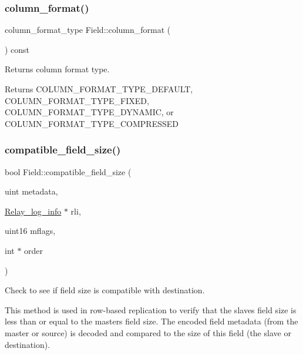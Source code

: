 \subsubsection{\texorpdfstring{column\+\_\+format()}{column\_format()}}
{\footnotesize\ttfamily column\+\_\+format\+\_\+type Field\+::column\+\_\+format (\begin{DoxyParamCaption}{ }\end{DoxyParamCaption}) const\hspace{0.3cm}{\ttfamily [inline]}}

Returns column format type.

\begin{DoxyReturn}{Returns}
C\+O\+L\+U\+M\+N\+\_\+\+F\+O\+R\+M\+A\+T\+\_\+\+T\+Y\+P\+E\+\_\+\+D\+E\+F\+A\+U\+LT, C\+O\+L\+U\+M\+N\+\_\+\+F\+O\+R\+M\+A\+T\+\_\+\+T\+Y\+P\+E\+\_\+\+F\+I\+X\+ED, C\+O\+L\+U\+M\+N\+\_\+\+F\+O\+R\+M\+A\+T\+\_\+\+T\+Y\+P\+E\+\_\+\+D\+Y\+N\+A\+M\+IC, or C\+O\+L\+U\+M\+N\+\_\+\+F\+O\+R\+M\+A\+T\+\_\+\+T\+Y\+P\+E\+\_\+\+C\+O\+M\+P\+R\+E\+S\+S\+ED 
\end{DoxyReturn}
\mbox{\label{classField_ab603b7f21a9116358e400dd7282cee50}} 
\subsubsection{\texorpdfstring{compatible\+\_\+field\+\_\+size()}{compatible\_field\_size()}}
{\footnotesize\ttfamily bool Field\+::compatible\+\_\+field\+\_\+size (\begin{DoxyParamCaption}\item[{uint}]{metadata,  }\item[{\mbox{\hyperlink{classRelay__log__info}{Relay\+\_\+log\+\_\+info}} $\ast$}]{rli,  }\item[{uint16}]{mflags,  }\item[{int $\ast$}]{order }\end{DoxyParamCaption})\hspace{0.3cm}{\ttfamily [virtual]}}

Check to see if field size is compatible with destination.

This method is used in row-\/based replication to verify that the slave\textquotesingle{}s field size is less than or equal to the master\textquotesingle{}s field size. The encoded field metadata (from the master or source) is decoded and compared to the size of this field (the slave or destination).

